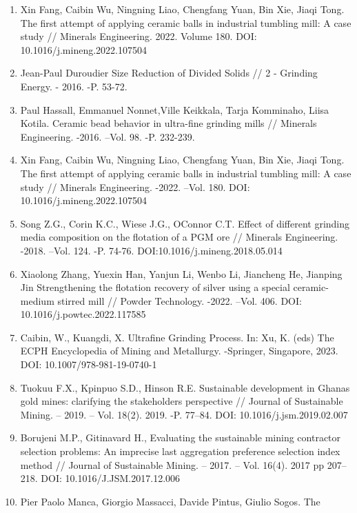 \begin{enumerate}
\def\labelenumi{\arabic{enumi}.}
\item
  Xin Fang, Caibin Wu, Ningning Liao, Chengfang Yuan, Bin Xie, Jiaqi
  Tong. The first attempt of applying ceramic balls in industrial
  tumbling mill: A case study // Minerals Engineering. 2022. Volume 180.
  DOI: 10.1016/j.mineng.2022.107504
\item
  Jean-Paul Duroudier Size Reduction of Divided Solids // 2 - Grinding
  Energy. - 2016. -P. 53-72.
\item
  Paul Hassall, Emmanuel Nonnet,Ville Keikkala, Tarja Komminaho, Liisa
  Kotila. Ceramic bead behavior in ultra-fine grinding mills // Minerals
  Engineering. -2016. --Vol. 98. -P. 232-239.
\item
  Xin Fang, Caibin Wu, Ningning Liao, Chengfang Yuan, Bin Xie, Jiaqi
  Tong. The first attempt of applying ceramic balls in industrial
  tumbling mill: A case study // Minerals Engineering. -2022. --Vol.
  180. DOI: 10.1016/j.mineng.2022.107504
\item
  Song Z.G., Corin K.C., Wiese J.G., O\textquotesingle Connor C.T.
  Effect of different grinding media composition on the flotation of a
  PGM ore // Minerals Engineering. -2018. --Vol. 124. -P. 74-76.
  DOI:10.1016/j.mineng.2018.05.014
\item
  Xiaolong Zhang, Yuexin Han, Yanjun Li, Wenbo Li, Jiancheng He,
  Jianping Jin Strengthening the flotation recovery of silver using a
  special ceramic-medium stirred mill // Powder Technology. -2022.
  --Vol. 406. DOI: 10.1016/j.powtec.2022.117585
\item
  Caibin, W., Kuangdi, X. Ultrafine Grinding Process. In: Xu, K. (eds)
  The ECPH Encyclopedia of Mining and Metallurgy. -Springer, Singapore,
  2023. DOI: 10.1007/978-981-19-0740-1
\item
  Tuokuu F.X., Kpinpuo S.D., Hinson R.E. Sustainable development in
  Ghana\textquotesingle s gold mines: clarifying the
  stakeholder\textquotesingle s perspective // Journal of Sustainable
  Mining. -- 2019. -- Vol. 18(2). 2019. -P. 77--84. DOI:
  10.1016/j.jsm.2019.02.007
\item
  Borujeni M.P., Gitinavard H., Evaluating the sustainable mining
  contractor selection problems: An imprecise last aggregation
  preference selection index method // Journal of Sustainable Mining. --
  2017. -- Vol. 16(4). 2017 pp 207--218. DOI: 10.1016/J.JSM.2017.12.006
\item
  Pier Paolo Manca, Giorgio Massacci, Davide Pintus, Giulio Sogos. The

\end{enumerate}

